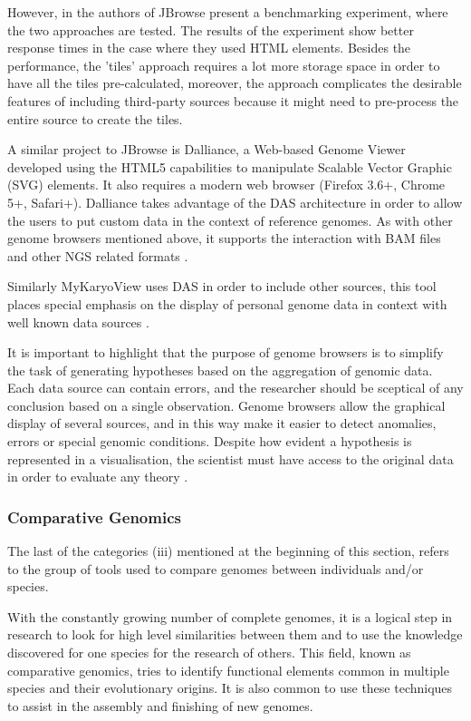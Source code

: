 However, in \cite{SKI2009} the authors of JBrowse present a benchmarking experiment, where the two approaches are tested. The results of the experiment show better response times in the case where they used HTML elements. Besides the performance, the 'tiles' approach requires a lot more storage space in order to have all the tiles pre-calculated, moreover, the approach complicates the desirable features of including third-party sources because it might need to pre-process the entire source to create the tiles.

A similar project to JBrowse is Dalliance, a Web-based Genome Viewer developed using the HTML5 capabilities to manipulate Scalable Vector Graphic (SVG) elements. It also requires a modern web browser (Firefox 3.6+, Chrome 5+, Safari+). Dalliance takes advantage of the DAS architecture in order to allow the users to put custom data in the context of reference genomes. As with other genome browsers mentioned above, it supports the interaction with BAM files and other NGS related formats \cite{DOW2011}. 

Similarly MyKaryoView uses DAS in order to include other sources, this tool places special emphasis on the display of personal genome data in context with well known data sources \cite{JIM2011}.

It is important to highlight that the purpose of genome browsers is to simplify the task of generating hypotheses based on the aggregation of genomic data. Each data source can contain errors, and the researcher should be sceptical of any conclusion based on a single observation. Genome browsers allow the graphical display of several sources, and in this way make it easier to detect anomalies, errors or special genomic conditions. Despite how evident a hypothesis is represented in a visualisation, the scientist must have access to the original data in order to evaluate any theory \cite{CLI2009}.

\subsubsection{Comparative Genomics}
The last of the categories (iii) mentioned at the beginning of this section, refers to the group of tools used to compare genomes between individuals and/or species.

With the constantly growing number of complete genomes, it is a logical step in research to look for high level similarities between them and to use the knowledge discovered for one species for the research of others. This field, known as comparative genomics, tries to identify functional elements common in multiple species and their evolutionary origins. It is also common to use these techniques to assist in the assembly and finishing of new genomes.

